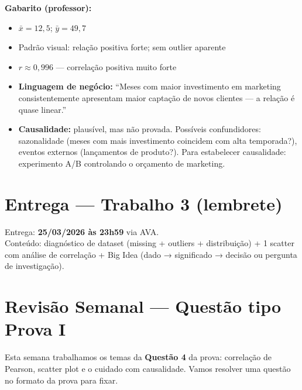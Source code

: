 \begin{SolvedBox}
\textbf{Gabarito (professor):}
\begin{itemize}
  \item $\bar{x} = 12{,}5$; $\bar{y} = 49{,}7$
  \item Padrão visual: relação positiva forte; sem outlier aparente
  \item $r \approx 0{,}996$ — correlação positiva muito forte
  \item \textbf{Linguagem de negócio:} ``Meses com maior investimento em marketing
  consistentemente apresentam maior captação de novos clientes — a relação é
  quase linear.''
  \item \textbf{Causalidade:} plausível, mas não provada. Possíveis confundidores:
  sazonalidade (meses com mais investimento coincidem com alta temporada?),
  eventos externos (lançamentos de produto?). Para estabelecer causalidade:
  experimento A/B controlando o orçamento de marketing.
\end{itemize}
\end{SolvedBox}

\section{Entrega — Trabalho 3 (lembrete)}

\begin{SolvedBox}
Entrega: \textbf{25/03/2026 às 23h59} via AVA.\\
Conteúdo: diagnóstico de dataset (missing + outliers + distribuição) + 1 scatter com análise
de correlação + Big Idea (dado → significado → decisão ou pergunta de investigação).
\end{SolvedBox}

\section{Revisão Semanal — Questão tipo Prova I}

\begin{NoteBox}
Esta semana trabalhamos os temas da \textbf{Questão 4} da prova:
correlação de Pearson, scatter plot e o cuidado com causalidade.
Vamos resolver uma questão no formato da prova para fixar.
\end{NoteBox}

